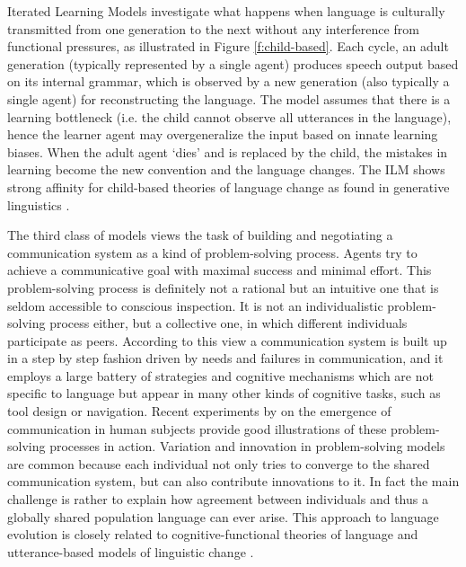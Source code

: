 Iterated Learning Models \citep[ILM,][]{brighton05cultural, kirby01spontaneous, kirby02emergence, kirby04from, smith03iterated} investigate what happens when language is culturally transmitted from one generation to the next without any interference from functional pressures, as illustrated in Figure \ref{f:child-based}. Each cycle, an adult generation (typically represented by a single agent) produces speech output based on its internal grammar, which is observed by a new generation (also typically a single agent) for reconstructing the language. The model assumes that there is a learning bottleneck (i.e. the child cannot observe all utterances in the language), hence the learner agent may overgeneralize the input based on innate learning biases. When the adult agent `dies' and is replaced by the child, the mistakes in learning become the new convention and the language changes. The ILM shows strong affinity for child-based theories of language change as found in generative linguistics \citep{king69historical}.

The third class of models views the task of building and negotiating a communication system as a kind of problem-solving process. Agents try to achieve a communicative goal with maximal success and minimal effort. This problem-solving process is definitely not a rational but an intuitive one that is seldom accessible to conscious inspection. It is not an individualistic problem-solving process either, but a collective one, in which different individuals participate as peers. According to this view a communication system is built up in a step by step fashion driven by needs and failures in communication, and it employs a large battery of strategies and cognitive mechanisms which are not specific to language but appear in many other kinds of cognitive tasks, such as tool design or navigation. Recent experiments by \citet{galantucci05experimental} on the emergence of communication in human subjects provide good illustrations of these problem-solving processes in action. Variation and innovation in problem-solving models are common because each individual not only tries to converge to the shared communication system, but can also contribute innovations to it. In fact the main challenge is rather to explain how agreement between individuals and thus a globally shared population language can ever arise. This approach to language evolution is closely related to cognitive-functional theories of language and utterance-based models of linguistic change \citep{croft00explaining, croft05relevance}.


